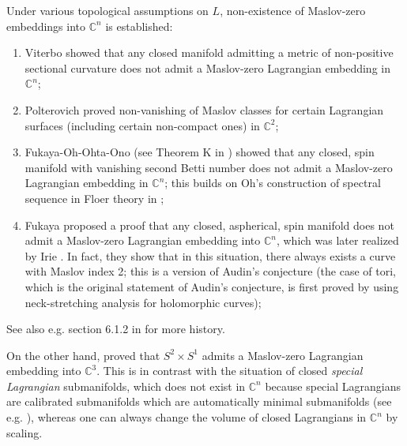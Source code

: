 \documentclass[10pt]{amsart}
\numberwithin{equation}{section}
\theoremstyle{plain}
\theoremstyle{definition}
\theoremstyle{remark}
\numberwithin{equation}{section}
\newcommand{\C}{\mathbb{C}}
\begin{document}
Under various topological assumptions on $L$, non-existence of Maslov-zero embeddings into $\C^n$ is established:
\begin{enumerate}
	\item Viterbo \cite{ViterboTori} showed that any closed manifold admitting a metric of non-positive sectional curvature does not admit a Maslov-zero Lagrangian embedding in $\C^n$; 
	\item Polterovich \cite{PolterovichMaslov} proved non-vanishing of Maslov classes for certain Lagrangian surfaces (including certain non-compact ones) in $\C^2$;
	\item Fukaya-Oh-Ohta-Ono (see Theorem K in \cite{FOOO1}) showed that any closed, spin manifold with vanishing second Betti number does not admit a Maslov-zero Lagrangian embedding in $\C^n$; this builds on Oh's construction of spectral sequence in Floer theory in \cite{OhSpecSeq};
	\item Fukaya \cite{FukayaLagrangian} proposed a proof that any closed, aspherical, spin manifold does not admit a Maslov-zero Lagrangian embedding into $\C^n$, which was later realized by Irie \cite{Irie1,Irie2}. In fact, they show that in this situation, there always exists a curve with Maslov index 2; this is a version of  Audin's conjecture \cite{AudinConj} (the case of tori, which is the original statement of  Audin's conjecture, is first proved by \cite{CieliebakMohnke} using neck-stretching analysis for holomorphic curves);
\end{enumerate}
See also e.g. section 6.1.2 in \cite{FOOO1} for more history.

On the other hand, \cite{EEMS} proved that $S^2\times S^1$ admits a Maslov-zero Lagrangian embedding into $\C^3$. 
This is in contrast with the situation of closed \emph{special Lagrangian} submanifolds, which does not exist in $\C^n$ because special Lagrangians are calibrated submanifolds which are automatically minimal submanifolds (see e.g. \cite{HarveyLawson}), whereas one can always change the volume of closed Lagrangians in $\C^n$ by scaling.
\end{document}

